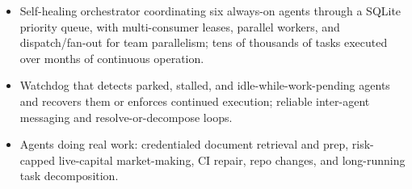 \begin{itemize}
  \item Self-healing orchestrator coordinating six always-on agents through a SQLite priority queue, with multi-consumer leases, parallel workers, and dispatch/fan-out for team parallelism; tens of thousands of tasks executed over months of continuous operation.
  \item Watchdog that detects parked, stalled, and idle-while-work-pending agents and recovers them or enforces continued execution; reliable inter-agent messaging and resolve-or-decompose loops.
  \item Agents doing real work: credentialed document retrieval and prep, risk-capped live-capital market-making, CI repair, repo changes, and long-running task decomposition.
\end{itemize}
